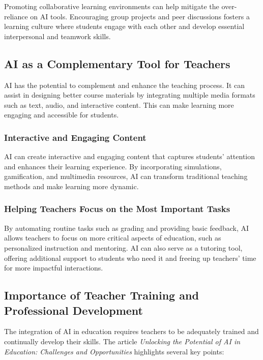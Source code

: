 \documentclass{article}
\begin{document}
Promoting collaborative learning environments can help mitigate the over-reliance on AI tools. Encouraging group projects and peer discussions fosters a learning culture where students engage with each other and develop essential interpersonal and teamwork skills.

\subsection{AI as a Complementary Tool for Teachers}

AI has the potential to complement and enhance the teaching process. It can assist in designing better course materials by integrating multiple media formats such as text, audio, and interactive content. This can make learning more engaging and accessible for students.

\subsubsection{Interactive and Engaging Content}

AI can create interactive and engaging content that captures students' attention and enhances their learning experience. By incorporating simulations, gamification, and multimedia resources, AI can transform traditional teaching methods and make learning more dynamic.

\subsubsection{Helping Teachers Focus on the Most Important Tasks}

By automating routine tasks such as grading and providing basic feedback, AI allows teachers to focus on more critical aspects of education, such as personalized instruction and mentoring. AI can also serve as a tutoring tool, offering additional support to students who need it and freeing up teachers' time for more impactful interactions.

\subsection{Importance of Teacher Training and Professional Development}

The integration of AI in education requires teachers to be adequately trained and continually develop their skills. The article \cite{Rashmi2023Unlocking} \textit{Unlocking the Potential of AI in Education: Challenges and Opportunities} highlights several key points:
\end{document}
